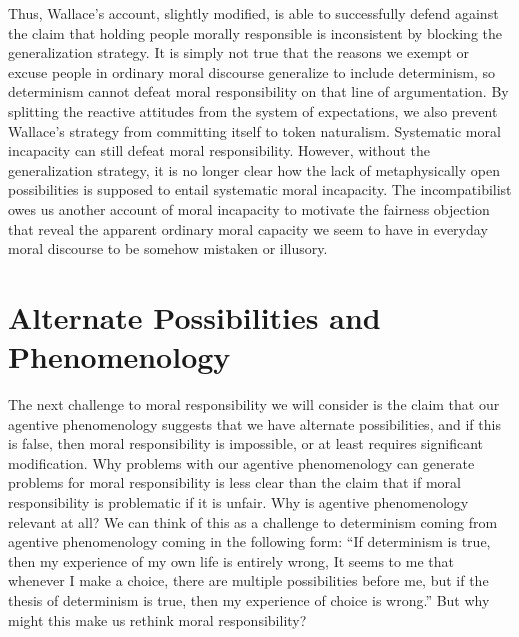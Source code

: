 \documentclass[phd,12pt,oneside,paper=letterpaper]{ubcthesis}
\begin{document}
Thus, Wallace's account, slightly modified, is able to successfully defend against the claim that holding people morally responsible is inconsistent by blocking the generalization strategy. It is simply not true that the reasons we exempt or excuse people in ordinary moral discourse generalize to include determinism, so determinism cannot defeat moral responsibility on that line of argumentation. By splitting the reactive attitudes from the system of expectations, we also prevent Wallace's strategy from committing itself to token naturalism. Systematic moral incapacity can still defeat moral responsibility. However, without the generalization strategy, it is no longer clear how the lack of metaphysically open possibilities is supposed to entail systematic moral incapacity. The incompatibilist owes us another account of moral incapacity to motivate the fairness objection that reveal the apparent ordinary moral capacity we seem to have in everyday moral discourse to be somehow mistaken or illusory. 

\section{Alternate Possibilities and Phenomenology}
The next challenge to moral responsibility we will consider is the claim that our agentive phenomenology suggests that we have alternate possibilities, and if this is false, then moral responsibility is impossible, or at least requires significant modification. Why problems with our agentive phenomenology can generate problems for moral responsibility is less clear than the claim that if moral responsibility is problematic if it is unfair. Why is agentive phenomenology relevant at all? We can think of this as a challenge to determinism coming from agentive phenomenology coming in the following form: ``If determinism is true, then my experience of my own life is entirely wrong, It seems to me that whenever I make a choice, there are multiple possibilities before me, but if the thesis of determinism is true, then my experience of choice is wrong.'' But why might this make us rethink moral responsibility?
\end{document}
